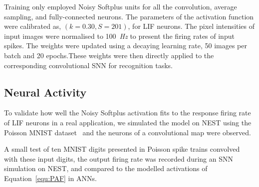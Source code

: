 \documentclass{article}
\begin{document}
Training only employed Noisy Softplus units for all the convolution, average sampling, and fully-connected neurons. %
The parameters of the activation function were calibrated as, $(k=0.30, S=201)$,  for LIF neurons.
The pixel intensities of input images were normalised to 100~\textit{Hz} to present the firing rates of input spikes.
The weights were updated using a decaying learning rate, 50 images per batch and 20 epochs.These weights were then directly applied to the corresponding convolutional SNN  for recognition tasks.


\subsection{Neural Activity}
To validate how well the Noisy Softplus activation fits to the response firing rate of LIF neurons in a real application, we simulated the model on NEST using the Poisson MNIST dataset~\cite{liu2016bench} and the neurons of a convolutional map were observed.

A small test of ten MNIST digits presented in Poisson spike trains  convolved with these input digits, the output firing rate was recorded during an SNN simulation on NEST, and compared to the modelled activations of Equation~\ref{equ:PAF} in ANNs.
\end{document}
